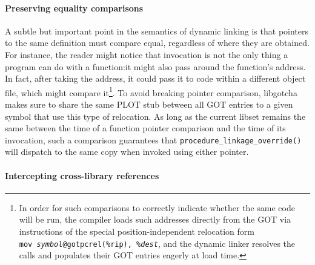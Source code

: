 \paragraph{Preserving equality comparisons}

A subtle but important point in the semantics of dynamic linking is that pointers to
the same definition must compare equal, regardless of where they are obtained.  For
instance,
the reader might notice that invocation is not the only thing a program can do with a
function:\@ it might also pass around the function's address.  In fact, after taking
the address, it could pass it to code within a different object file, which might
compare it\footnote{In order for such comparisons to correctly indicate whether the
same code will be run, the compiler loads such addresses directly from the GOT via
instructions of the special position-independent relocation form
\texttt{mov~\textit{symbol}@gotpcrel(\%rip),~\%\textit{dest}}, and the dynamic linker
resolves the calls and populates their GOT entries eagerly at load time.}.  To avoid
breaking pointer comparison, libgotcha makes sure to share the same PLOT
stub between all GOT entries to a given symbol that use this type of
relocation.  As long as the current libset remains the same between the time of a
function pointer comparison and the time of its invocation, such a comparison
guarantees that \texttt{procedure\_linkage\_override()} will dispatch to the same
copy when invoked using either pointer.

\paragraph{Intercepting cross-library references}

